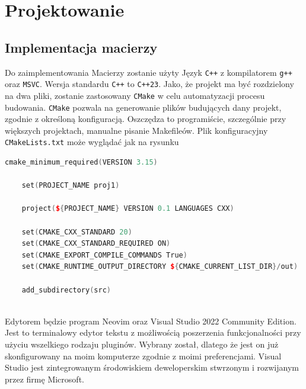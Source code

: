 	\newpage
\section{Projektowanie}		%

\subsection{Implementacja macierzy}


Do zaimplementowania Macierzy zostanie użyty Język \texttt{C++} z kompilatorem \texttt{g++} oraz \texttt{MSVC}. Wersja standardu \texttt{C++} to \texttt{C++23}. Jako, że projekt ma być rozdzielony na dwa pliki, zostanie zastosowany \texttt{CMake} w celu automatyzacji procesu budowania. \texttt{CMake} pozwala na generowanie plików budujących dany projekt, zgodnie z określoną konfiguracją. Oszczędza to programiście, szczególnie przy większych projektach, manualne pisanie Makefileów.
Plik konfiguracyjny \texttt{CMakeLists.txt} może wyglądać jak na rysunku

\begin{lstlisting}[caption=Plik konfiguracyjny CMake, label={lst:cmakelists}, language=C++]
	cmake_minimum_required(VERSION 3.15)
	
	set(PROJECT_NAME proj1)
	
	project(${PROJECT_NAME} VERSION 0.1 LANGUAGES CXX)
	
	set(CMAKE_CXX_STANDARD 20)
	set(CMAKE_CXX_STANDARD_REQUIRED ON)
	set(CMAKE_EXPORT_COMPILE_COMMANDS True)
	set(CMAKE_RUNTIME_OUTPUT_DIRECTORY ${CMAKE_CURRENT_LIST_DIR}/out)
	
	add_subdirectory(src)
	
\end{lstlisting}

Edytorem będzie program Neovim oraz Visual Studio 2022 Community Edition. Jest to terminalowy edytor tekstu z możliwością poszerzenia funkcjonalności przy użyciu wszelkiego rodzaju pluginów. Wybrany został, dlatego że jest on już skonfigurowany na moim komputerze zgodnie z moimi preferencjami. Visual Studio jest zintegrowanym środowiskiem deweloperskim stwrzonym i rozwijanym przez firmę Microsoft.

